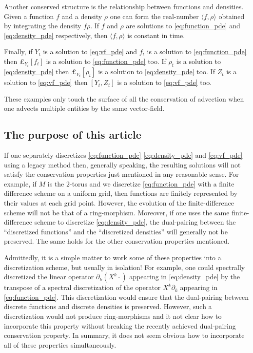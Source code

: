 \documentclass[12pt]{amsart}
\begin{document}
Another conserved structure is the relationship between functions and densities.  Given a function $f$ and a density $\rho$
one can form the real-number $\langle f, \rho \rangle$ obtained by integrating the density $f \rho$.
If $f$ and $\rho$ are solutions to \eqref{eq:function_pde} and \eqref{eq:density_pde} respectively, then $\langle f , \rho \rangle$ is constant in time.

Finally, if $Y_t$ is a solution to \eqref{eq:vf_pde} and $f_t$ is a solution to \eqref{eq:function_pde} then $\pounds_{Y_t}[f_t]$ is a solution to \eqref{eq:function_pde} too.
If $\rho_t$ is a solution to \eqref{eq:density_pde} then $\pounds_{Y_t}[ \rho_t]$ is a solution to \eqref{eq:density_pde} too.
If $Z_t$ is a solution to \eqref{eq:vf_pde} then $[Y_t,Z_t]$ is a solution to \eqref{eq:vf_pde} too.

These examples only touch the surface of all the conservation of advection when one advects multiple entities by the same vector-field.

\subsection{The purpose of this article}
\label{sec:purpose}
If one separately discretizes \eqref{eq:function_pde} \eqref{eq:density_pde} and \eqref{eq:vf_pde} using a legacy method
then, generally speaking, the resulting solutions will not satisfy the conservation properties just mentioned in any reasonable sense.
For example, if $M$ is the $2$-torus and we discretize \eqref{eq:function_pde} with a finite difference scheme on a uniform grid,
then functions are finitely represented by their values at each grid point.
However, the evolution of the finite-difference scheme will not be that of a ring-morphism.
Moreover, if one uses the same finite-difference scheme to discretize \eqref{eq:density_pde}, the dual-pairing between the 
``discretized functions'' and the ``discretized densities'' will generally not be preserved.
The same holds for the other conservation properties mentioned.

Admittedly, it is a simple matter to work some of these properties into a discretization scheme,
but usually in isolation!
For example, one could spectrally discretized the linear operator  $\partial_k (X^k \cdot )$ appearing in \eqref{eq:density_pde} by the transpose of
a spectral discretization of the operator $X^k \partial_k$ appearing in \eqref{eq:function_pde}.
This discretization would ensure that the dual-pairing between discrete functions and discrete densities is preserved.
However, such a discretization would not produce ring-morphisms and it not clear how to incorporate this
property without breaking the recently achieved dual-pairing conservation property.
In summary, it does not seem obvious how to incorporate all of these properties simultaneously.
\end{document}
